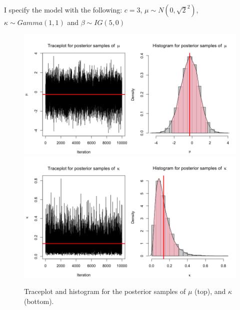 \documentclass[a4paper, 10pt]{article}
\begin{document}
\begin{enumerate}
    I specify the model with the following: $c=3$, $\mu\sim N(0, \sqrt{2}^2)$, $\kappa \sim Gamma(1,1)$ and $\beta\sim IG(5,0)$
    \begin{figure}[h!]
        \centering
        \includegraphics[scale = 0.4]{Prob3_mu.png}\\
        \includegraphics[scale = 0.4]{Prob3_Kappa.png}\\
        \caption{Traceplot and histogram for the posterior samples of $\mu$ (top), and $\kappa$ (bottom).}
        \label{prob3_fig}
    \end{figure}
    

\end{enumerate}
\end{document}
